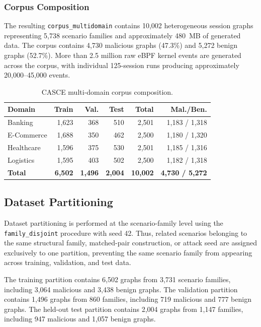 \documentclass[conference]{IEEEtran}
\begin{document}
\subsubsection{Corpus Composition}

The resulting \texttt{corpus\_multidomain} contains 10,002 heterogeneous
session graphs representing 5,738 scenario families and approximately
480~MB of generated data. The corpus contains 4,730 malicious graphs
(47.3\%) and 5,272 benign graphs (52.7\%). More than 2.5 million raw
eBPF kernel events are generated across the corpus, with individual
125-session runs producing approximately 20,000--45,000 events.

\begin{table}[t]
\centering
\caption{CASCE multi-domain corpus composition.}
\label{tab:dataset_composition}
\small
\begin{tabular}{@{}lrrrrr@{}}
\toprule
\textbf{Domain} &
\textbf{Train} &
\textbf{Val.} &
\textbf{Test} &
\textbf{Total} &
\textbf{Mal./Ben.} \\
\midrule
Banking
& 1,623 & 368 & 510 & 2,501 & 1,183 / 1,318 \\
E-Commerce
& 1,688 & 350 & 462 & 2,500 & 1,180 / 1,320 \\
Healthcare
& 1,596 & 375 & 530 & 2,501 & 1,185 / 1,316 \\
Logistics
& 1,595 & 403 & 502 & 2,500 & 1,182 / 1,318 \\
\midrule
\textbf{Total}
& \textbf{6,502} & \textbf{1,496} & \textbf{2,004}
& \textbf{10,002} & \textbf{4,730 / 5,272} \\
\bottomrule
\end{tabular}
\end{table}

\subsection{Dataset Partitioning}
\label{subsec:dataset_partitioning}

Dataset partitioning is performed at the scenario-family level using the
\texttt{family\_disjoint} procedure with seed 42. Thus, related scenarios
belonging to the same structural family, matched-pair construction, or
attack seed are assigned exclusively to one partition, preventing the same
scenario family from appearing across training, validation, and test data.

The training partition contains 6,502 graphs from 3,731 scenario families,
including 3,064 malicious and 3,438 benign graphs. The validation partition
contains 1,496 graphs from 860 families, including 719 malicious and
777 benign graphs. The held-out test partition contains 2,004 graphs from
1,147 families, including 947 malicious and 1,057 benign graphs.
\end{document}
